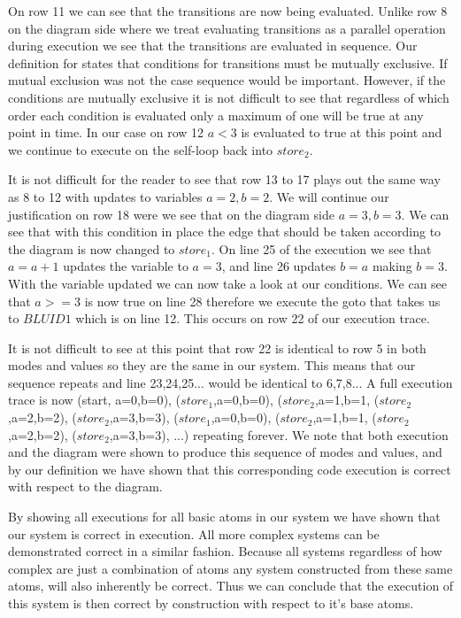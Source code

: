 On row 11 we can see that the transitions are now being evaluated. Unlike row 8 on the diagram side where
we treat evaluating transitions as a parallel operation during execution we see that the transitions are evaluated in 
sequence. Our definition for \plccharts states that conditions for transitions must be mutually exclusive.
If mutual exclusion was not the case sequence would be important. However, if the conditions are mutually
exclusive it is not difficult to see that regardless of which order each condition is evaluated only a maximum
of one will be true at any point in time. In our case on row 12 $a<3$ is evaluated to true at this 
point and we continue to execute on the self-loop back into $store_2$.

It is not difficult for the reader to see that row 13 to 17 plays out the same way as 8 to 12 with updates to
variables $a=2, b=2$. We will continue our justification on row 18 were we see that on the diagram side $a=3,b=3$.
We can see that with this condition in place the edge that should be taken according to the diagram is now changed
to $store_1$. On line 25 of the execution we see that $a=a+1$ updates the 
variable to $a=3$, and line 26 updates $b=a$ making $b=3$. With the variable updated we can now take a look at our
conditions. We can see that $a >= 3$ is now true on line 28 therefore we execute the goto that takes us to $BLUID1$
which is on line 12. This occurs on row 22 of our execution trace.

It is not difficult to see at this point that row 22 is identical to row 5 in both modes and values so they are the
same in our system. This means that our sequence repeats and line 23,24,25... would be identical to 6,7,8... A full execution trace is now (start, {a=0,b=0}), ($store_1$,{a=0,b=0}), ($store_2$,{a=1,b=1},
($store_2$,{a=2,b=2}), ($store_2$,{a=3,b=3}), ($store_1$,{a=0,b=0}), ($store_2$,{a=1,b=1},
($store_2$,{a=2,b=2}), ($store_2$,{a=3,b=3}), ...) repeating forever. We note that both execution and the diagram
were shown to produce this sequence of modes and values, and by our definition we have shown that this 
corresponding code execution is correct with respect to the diagram. 

By showing all executions for all basic atoms in our system we have shown that our system is correct in execution.
All more complex systems can be demonstrated correct in a similar fashion. Because all systems regardless of how
complex are just a combination of atoms any system constructed from these same atoms,
will also inherently be correct. Thus we can conclude that the execution of this system is then correct
by construction with respect to it's base atoms.